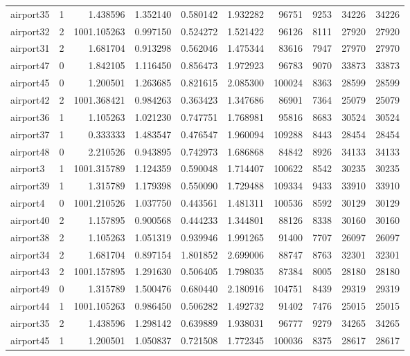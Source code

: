 \begin{longtable}{|l|r|r|r|r|r|r|r|r|r|}
airport35 & 1 & 1.438596 & 1.352140 & 0.580142 & 1.932282 & 96751 & 9253 & 34226 & 34226 \\
airport32 & 2 & 1001.105263 & 0.997150 & 0.524272 & 1.521422 & 96126 & 8111 & 27920 & 27920 \\
airport31 & 2 & 1.681704 & 0.913298 & 0.562046 & 1.475344 & 83616 & 7947 & 27970 & 27970 \\
airport47 & 0 & 1.842105 & 1.116450 & 0.856473 & 1.972923 & 96783 & 9070 & 33873 & 33873 \\
airport45 & 0 & 1.200501 & 1.263685 & 0.821615 & 2.085300 & 100024 & 8363 & 28599 & 28599 \\
airport42 & 2 & 1001.368421 & 0.984263 & 0.363423 & 1.347686 & 86901 & 7364 & 25079 & 25079 \\
airport36 & 1 & 1.105263 & 1.021230 & 0.747751 & 1.768981 & 95816 & 8683 & 30524 & 30524 \\
airport37 & 1 & 0.333333 & 1.483547 & 0.476547 & 1.960094 & 109288 & 8443 & 28454 & 28454 \\
airport48 & 0 & 2.210526 & 0.943895 & 0.742973 & 1.686868 & 84842 & 8926 & 34133 & 34133 \\
airport3 & 1 & 1001.315789 & 1.124359 & 0.590048 & 1.714407 & 100622 & 8542 & 30235 & 30235 \\
airport39 & 1 & 1.315789 & 1.179398 & 0.550090 & 1.729488 & 109334 & 9433 & 33910 & 33910 \\
airport4 & 0 & 1001.210526 & 1.037750 & 0.443561 & 1.481311 & 100536 & 8592 & 30129 & 30129 \\
airport40 & 2 & 1.157895 & 0.900568 & 0.444233 & 1.344801 & 88126 & 8338 & 30160 & 30160 \\
airport38 & 2 & 1.105263 & 1.051319 & 0.939946 & 1.991265 & 91400 & 7707 & 26097 & 26097 \\
airport34 & 2 & 1.681704 & 0.897154 & 1.801852 & 2.699006 & 88747 & 8763 & 32301 & 32301 \\
airport43 & 2 & 1001.157895 & 1.291630 & 0.506405 & 1.798035 & 87384 & 8005 & 28180 & 28180 \\
airport49 & 0 & 1.315789 & 1.500476 & 0.680440 & 2.180916 & 104751 & 8439 & 29319 & 29319 \\
airport44 & 1 & 1001.105263 & 0.986450 & 0.506282 & 1.492732 & 91402 & 7476 & 25015 & 25015 \\
airport35 & 2 & 1.438596 & 1.298142 & 0.639889 & 1.938031 & 96777 & 9279 & 34265 & 34265 \\
airport45 & 1 & 1.200501 & 1.050837 & 0.721508 & 1.772345 & 100036 & 8375 & 28617 & 28617 \\

\end{longtable}
